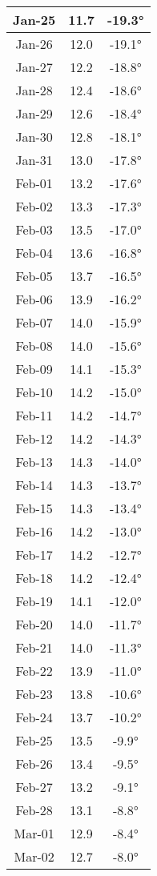\begin{footnotesize}
\begin{minipage}{0.33\textwidth}
\begin{tabular}[t]{c | c | c }
Jan-25 & 11.7 & -19.3°\\\hline
Jan-26 & 12.0 & -19.1°\\\hline
Jan-27 & 12.2 & -18.8°\\\hline
Jan-28 & 12.4 & -18.6°\\\hline
Jan-29 & 12.6 & -18.4°\\\hline
Jan-30 & 12.8 & -18.1°\\\hline
Jan-31 & 13.0 & -17.8°\\\hline
Feb-01 & 13.2 & -17.6°\\\hline
Feb-02 & 13.3 & -17.3°\\\hline
Feb-03 & 13.5 & -17.0°\\\hline
Feb-04 & 13.6 & -16.8°\\\hline
Feb-05 & 13.7 & -16.5°\\\hline
Feb-06 & 13.9 & -16.2°\\\hline
Feb-07 & 14.0 & -15.9°\\\hline
Feb-08 & 14.0 & -15.6°\\\hline
Feb-09 & 14.1 & -15.3°\\\hline
Feb-10 & 14.2 & -15.0°\\\hline
Feb-11 & 14.2 & -14.7°\\\hline
Feb-12 & 14.2 & -14.3°\\\hline
Feb-13 & 14.3 & -14.0°\\\hline
Feb-14 & 14.3 & -13.7°\\\hline
Feb-15 & 14.3 & -13.4°\\\hline
Feb-16 & 14.2 & -13.0°\\\hline
Feb-17 & 14.2 & -12.7°\\\hline
Feb-18 & 14.2 & -12.4°\\\hline
Feb-19 & 14.1 & -12.0°\\\hline
Feb-20 & 14.0 & -11.7°\\\hline
Feb-21 & 14.0 & -11.3°\\\hline
Feb-22 & 13.9 & -11.0°\\\hline
Feb-23 & 13.8 & -10.6°\\\hline
Feb-24 & 13.7 & -10.2°\\\hline
Feb-25 & 13.5 & -9.9°\\\hline
Feb-26 & 13.4 & -9.5°\\\hline
Feb-27 & 13.2 & -9.1°\\\hline
Feb-28 & 13.1 & -8.8°\\\hline
Mar-01 & 12.9 & -8.4°\\\hline
Mar-02 & 12.7 & -8.0°\\\hline

\end{tabular}
\end{minipage}
\end{footnotesize}
